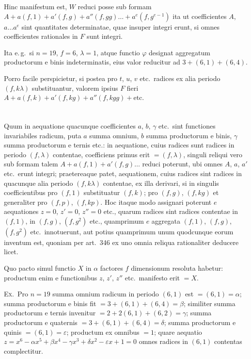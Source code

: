 \documentclass[12pt,a4paper]{article}
\theoremstyle{plain}
\theoremstyle{definition}
\theoremstyle{remark}
\begin{document}
Hinc manifestum est, $W$ reduci posse sub formam $A+a(f,1)+a'(f,g)+a''(f,gg)\ldots+a^e(f,g^{e-1})$ ita ut coefficientes $A$, $a\ldots a^e$ sint quantitates determinatae, quae insuper integri erunt, si omnes coefficientes rationales in $F$ sunt integri.

Ita e.\,g.\ si $n=19$, $f=6$, $\lambda=1$, atque functio $\varphi$ designat aggregatum productorum e binis indeterminatis, eius valor reducitur ad $3+(6,1)+(6,4)$.

Porro facile perspicietur, si postea pro $t$, $u$, $v$ etc.\ radices ex alia periodo $(f,k\lambda)$ substituantur, valorem ipsius $F$ fieri $A+a(f,k)+a'(f,kg)+a''(f,kgg)+\text{etc.}$

\section{}

Quum in aequatione quacunque coefficientes $a$, $b$, $\gamma$ etc.\ sint functiones invariabiles radicum, puta $a$ summa omnium, $b$ summa productorum e binis, $\gamma$ summa productorum e ternis etc.: in aequatione, cuius radices sunt radices in periodo $(f,\lambda)$ contentae, coefficiens primus erit $=(f,\lambda)$, singuli reliqui vero sub formam talem $A+a(f,1)+a'(f,g)\ldots$ reduci poterunt, ubi omnes $A$, $a$, $a'$ etc.\ erunt integri; praetereaque patet, aequationem, cuius radices sint radices in quacunque alia periodo $(f,k\lambda)$ contentae, ex illa derivari, si in singulis coefficientibus pro $(f,1)$ substituatur $(f,k)$; pro $(f,g)$, $(f,kg)$ et generaliter pro $(f,p)$, $(f,kp)$. Hoc itaque modo assignari poterunt $e$ aequationes $z=0$, $z'=0$, $z''=0$ etc., quarum radices sint radices contentae in $(f,1)$, in $(f,g)$, $(f,g^2)$ etc., quamprimum $e$ aggregata $(f,1)$, $(f,g)$, $(f,g^2)$ etc.\ innotuerunt, aut potius quamprimum unum quodcunque eorum inventum est, quoniam per art.\ 346 ex uno omnia reliqua rationaliter deducere licet.

Quo pacto simul functio $X$ in $\alpha$ factores $f$ dimensionum resoluta habetur: productum enim e functionibus $z$, $z'$, $z''$ etc.\ manifesto erit $=X$.

\textsc{Ex.}\ Pro $n=19$ summa omnium radicum in periodo $(6,1)$ est $=(6,1)=\alpha$; summa productorum e binis fit $=3+(6,1)+(6,4)=\beta$; similiter summa productorum e ternis invenitur $=2+2(6,1)+(6,2)=\gamma$; summa productorum e quaternis $=3+(6,1)+(6,4)=\delta$; summa productorum e quinis $=(6,1)=\varepsilon$; productum ex omnibus $=1$; quare aequatio $z=x^6-\alpha x^5+\beta x^4-\gamma x^3+\delta x^2-\varepsilon x+1=0$ omnes radices in $(6,1)$ contentas complectitur.
\end{document}
